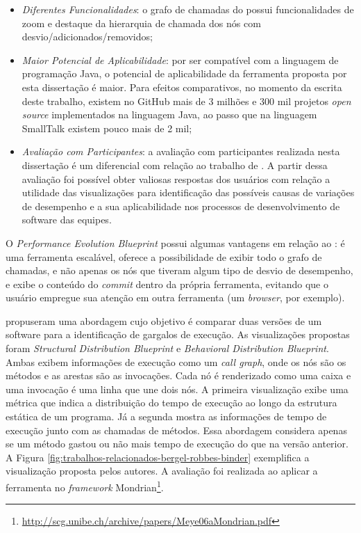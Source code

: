 \begin{itemize}
   \item \textit{Diferentes Funcionalidades}: o grafo de chamadas do {\textit{\toolName}} possui funcionalidades de zoom e destaque da hierarquia de chamada dos nós com desvio/adicionados/removidos;
   \item \textit{Maior Potencial de Aplicabilidade}: por ser compatível com a linguagem de programação Java, o potencial de aplicabilidade da ferramenta proposta por esta dissertação é maior. Para efeitos comparativos, no momento da escrita deste trabalho, existem no GitHub mais de 3 milhões e 300 mil projetos \textit{open source} implementados na linguagem Java, ao passo que na linguagem SmallTalk existem pouco mais de 2 mil;
   \item \textit{Avaliação com Participantes}: a avaliação com participantes realizada nesta dissertação é um diferencial com relação ao trabalho de \citeauthor{SandovalAlcocer2013}. A partir dessa avaliação foi possível obter valiosas respostas dos usuários com relação a utilidade das visualizações para identificação das possíveis causas de variações de desempenho e a sua aplicabilidade nos processos de desenvolvimento de software das equipes.
\end{itemize}

O \textit{Performance Evolution Blueprint} possui algumas vantagens em relação ao \textit{\toolName}: é uma ferramenta escalável, oferece a possibilidade de exibir todo o grafo de chamadas, e não apenas os nós que tiveram algum tipo de desvio de desempenho, e exibe o conteúdo do \textit{commit} dentro da própria ferramenta, evitando que o usuário empregue sua atenção em outra ferramenta (um \textit{browser}, por exemplo).


\citeauthor{Bergel} propuseram uma abordagem cujo objetivo é comparar duas versões de um software para a identificação de gargalos de execução. As visualizações propostas foram \textit{Structural Distribution Blueprint} e \textit{Behavioral Distribution Blueprint}. Ambas exibem informações de execução como um \textit{call graph}, onde os nós são os métodos e as arestas são as invocações. Cada nó é renderizado como uma caixa e uma invocação é uma linha que une dois nós. A primeira visualização exibe uma métrica que indica a distribuição do tempo de execução ao longo da estrutura estática de um programa. Já a segunda mostra as informações de tempo de execução junto com as chamadas de métodos. Essa abordagem considera apenas se um método gastou ou não mais tempo de execução do que na versão anterior. A Figura \ref{fig:trabalhos-relacionados-bergel-robbes-binder} exemplifica a visualização proposta pelos autores. A avaliação foi realizada ao aplicar a ferramenta no \textit{framework} Mondrian\footnote{\href{http://scg.unibe.ch/archive/papers/Meye06aMondrian.pdf}{http://scg.unibe.ch/archive/papers/Meye06aMondrian.pdf}}.

